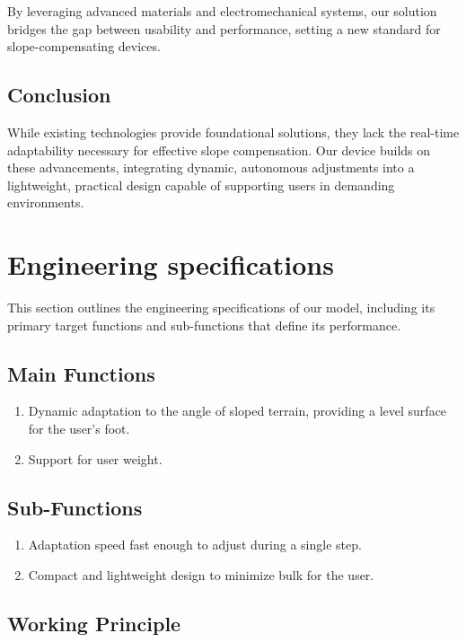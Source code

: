 \documentclass[lettersize,journal]{IEEEtran}
\begin{document}
By leveraging advanced materials and electromechanical systems, our solution bridges the gap between usability and performance, setting a new standard for slope-compensating devices.


\subsection{Conclusion}

While existing technologies provide foundational solutions, they lack the real-time adaptability necessary for effective slope compensation. Our device builds on these advancements, integrating dynamic, autonomous adjustments into a lightweight, practical design capable of supporting users in demanding environments.


\section{Engineering specifications}

This section outlines the engineering specifications of our model, including its primary target functions and sub-functions that define its performance. 

\subsection{Main Functions}
\begin{enumerate}
    \item Dynamic adaptation to the angle of sloped terrain, providing a level surface for the user's foot.

    \item Support for user weight.

\end{enumerate}

\subsection{Sub-Functions}
\begin{enumerate}
    \item Adaptation speed fast enough to adjust during a single step.

    \item Compact and lightweight design to minimize bulk for the user.

\end{enumerate}

\subsection{Working Principle}%
\end{document}
